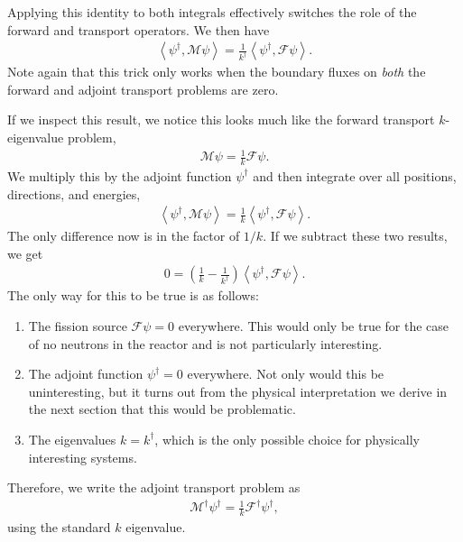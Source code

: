 Applying this identity to both integrals effectively switches the role of the forward and transport operators. We then have
\begin{align}
  \left< \psi^\dagger, \mathcal{M} \psi \right>  = \frac{1}{k^\dagger} \left< \psi^\dagger, \mathcal{F} \psi \right> .
\end{align}
Note again that this trick only works when the boundary fluxes on \emph{both} the forward and adjoint transport problems are zero.

If we inspect this result, we notice this looks much like the forward transport $k$-eigenvalue problem,
\begin{align}
  \mathcal{M} \psi = \frac{1}{k} \mathcal{F} \psi . \label{Eq:kinetics_forwardKEigenvalueTransportProblemOperator}
\end{align}
We multiply this by the adjoint function $\psi^\dagger$ and then integrate over all positions, directions, and energies,
\begin{align}
  \left< \psi^\dagger, \mathcal{M} \psi \right>  = \frac{1}{k} \left< \psi^\dagger, \mathcal{F} \psi \right> .
\end{align}
The only difference now is in the factor of $1/k$. If we subtract these two results, we get
\begin{align}
  0  = \left( \frac{1}{k} - \frac{1}{k^\dagger} \right) \left< \psi^\dagger, \mathcal{F} \psi \right> .
\end{align}
The only way for this to be true is as follows:
\begin{enumerate}
  \item The fission source $\mathcal{F} \psi = 0$ everywhere. This would only be true for the case of no neutrons in the reactor and is not particularly interesting.
  \item The adjoint function $\psi^\dagger = 0$ everywhere. Not only would this be uninteresting, but it turns out from the physical interpretation we derive in the next section that this would be problematic.
  \item The eigenvalues $k = k^\dagger$, which is the only possible choice for physically interesting systems.
\end{enumerate}
Therefore, we write the adjoint transport problem as
\begin{align}
  \mathcal{M}^\dagger \psi^\dagger = \frac{1}{k} \mathcal{F}^\dagger \psi^\dagger , \label{Eq:kinetics_AdjointTransportKEigenvalueOperator}
\end{align}
using the standard $k$ eigenvalue.

